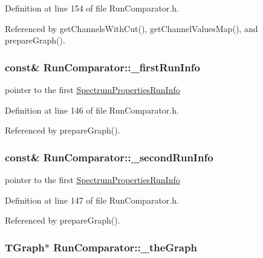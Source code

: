 Definition at line 154 of file Run\-Comparator.\-h.



Referenced by get\-Channels\-With\-Cut(), get\-Channel\-Values\-Map(), and prepare\-Graph().

\hypertarget{class_run_comparator_a3893b88661dc9ab2c46b8881d20772a2}{
\subsubsection[{\-\_\-first\-Run\-Info}]{ const\& Run\-Comparator\-::\-\_\-first\-Run\-Info\hspace{0.3cm}{\ttfamily [protected]}}}\label{class_run_comparator_a3893b88661dc9ab2c46b8881d20772a2}


pointer to the first \hyperlink{class_spectrum_properties_run_info}{Spectrum\-Properties\-Run\-Info} 



Definition at line 146 of file Run\-Comparator.\-h.



Referenced by prepare\-Graph().

\hypertarget{class_run_comparator_a2dc5760e0e8acc987f8a56a906895e5a}{
\subsubsection[{\-\_\-second\-Run\-Info}]{ const\& Run\-Comparator\-::\-\_\-second\-Run\-Info\hspace{0.3cm}{\ttfamily [protected]}}}\label{class_run_comparator_a2dc5760e0e8acc987f8a56a906895e5a}


pointer to the first \hyperlink{class_spectrum_properties_run_info}{Spectrum\-Properties\-Run\-Info} 



Definition at line 147 of file Run\-Comparator.\-h.



Referenced by prepare\-Graph().

\hypertarget{class_run_comparator_ade24b6bfa3960ac66f027a2669014d6a}{
\subsubsection[{\-\_\-the\-Graph}]{\setlength{\rightskip}{0pt plus 5cm}T\-Graph$\ast$ Run\-Comparator\-::\-\_\-the\-Graph\hspace{0.3cm}{\ttfamily [protected]}}}\label{class_run_comparator_ade24b6bfa3960ac66f027a2669014d6a}


